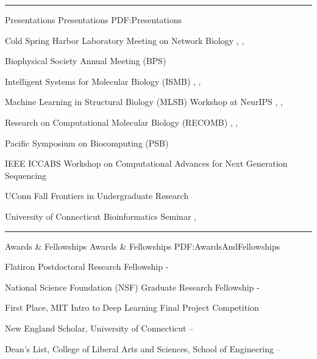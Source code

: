 \documentclass[letterpaper,MMMyyyy,nonstopmode]{simpleresumecv}
\begin{document}
\begin{Body}
\BigGap
\hrule
\Section
{Presentations}
{Presentations}
{PDF:Presentations}

\Entry
{Cold Spring Harbor Laboratory Meeting on Network Biology}
\hfill
{}, , 
\Gap

\Entry
{Biophysical Society Annual Meeting (BPS)}
\hfill
{}
\Gap

\Entry
{Intelligent Systems for Molecular Biology (ISMB)}
\hfill
{}, , 
\Gap

\Entry
{Machine Learning in Structural Biology (MLSB) Workshop at NeurIPS}
\hfill
{}, , 
\Gap

\Entry
{Research on Computational Molecular Biology (RECOMB)}
\hfill
{}, , 
\Gap

\Entry
{Pacific Symposium on Biocomputing (PSB)}
\hfill
{}
\Gap

\Entry
{IEEE ICCABS Workshop on Computational Advances for Next Generation Sequencing}
\hfill
{}
\Gap

\Entry
{UConn Fall Frontiers in Undergraduate Research}
\hfill
{}
\Gap

\Entry
{University of Connecticut Bioinformatics Seminar}
\hfill
{}, 

\BigGap
\hrule
\Section
{Awards \&\newline
Fellowships}
{Awards \& Fellowships}
{PDF:AwardsAndFellowships}

\Entry
{Flatiron Postdoctoral Research Fellowship}
\hfill
{} - 
\Gap

\Entry
{National Science Foundation (NSF) Graduate Research Fellowship}
\hfill
{} - 
\Gap

\Entry
{First Place, MIT Intro to Deep Learning Final Project Competition}
\hfill
{}
\Gap

\Entry
{New England Scholar, University of Connecticut}
\hfill
{} -- 
\Gap

\Entry
{Dean's List, College of Liberal Arts and Sciences, School of Engineering}
\hfill
{} --
\Gap


\end{Body}
\end{document}
